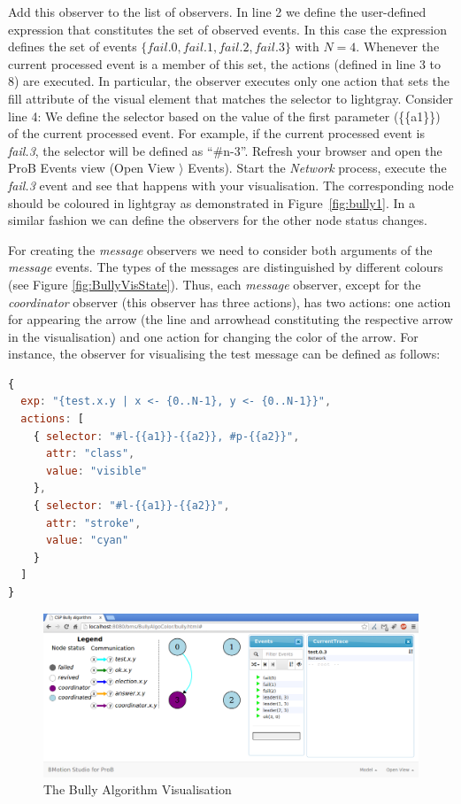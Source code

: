 Add this observer to the list of observers.
In line 2 we define the user-defined expression that constitutes the set of observed events.
In this case the expression defines the set of events $\{fail.0, fail.1, fail.2, fail.3\}$ with $N=4$.
Whenever the current processed event is a member of this set, the actions (defined in line 3 to 8) are executed.
In particular, the observer executes only one action that sets the fill attribute of the visual element that matches the selector to lightgray.
Consider line 4: We define the selector based on the value of the first parameter (\{\{a1\}\}) of the current processed event.
For example, if the current processed event is \textit{fail.3}, the selector will be defined as ``\#n-3''.
Refresh your browser and open the ProB Events view (\textsf{Open View $\rangle$ Events}).
Start the \textit{Network} process, execute the \textit{fail.3} event and see that happens with your visualisation.
The corresponding node should be coloured in lightgray as demonstrated in Figure~\ref{fig:bully1}.
In a similar fashion we can define the observers for the other node status changes. 

For creating the \textit{message} observers we need to consider both arguments of the \textit{message} events.
The types of the messages are distinguished by different colours (see Figure \ref{fig:BullyVisState}).
Thus, each \textit{message} observer, except for the \textit{coordinator} observer (this observer has three actions), has two actions: one action for appearing the arrow (the line and arrowhead constituting the respective arrow in the visualisation) and one action for changing the color of the arrow.
For instance, the observer for visualising the test message can be defined as follows:

\begin{lstlisting}[language=JavaScript]
{
  exp: "{test.x.y | x <- {0..N-1}, y <- {0..N-1}}",
  actions: [
    { selector: "#l-{{a1}}-{{a2}}, #p-{{a2}}",
      attr: "class",
      value: "visible"
    },
    { selector: "#l-{{a1}}-{{a2}}",
      attr: "stroke",
      value: "cyan"
    }
  ]
}
\end{lstlisting}

\begin{figure}[h!]\centering
	\includegraphics[width=16cm]{img/tutorial/bully2}
	\caption{The Bully Algorithm Visualisation}
	\label{fig:bully2}
\end{figure}

